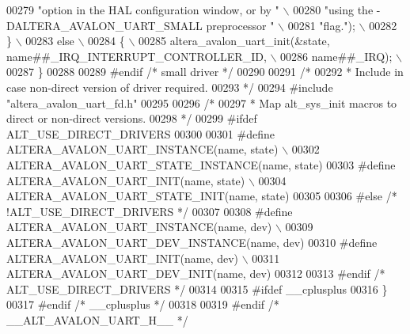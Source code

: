 \begin{DoxyCode}
00279 \textcolor{preprocessor}{                    "option in the HAL configuration window, or by "       \(\backslash\)}
00280 \textcolor{preprocessor}{                    "using the -DALTERA\_AVALON\_UART\_SMALL preprocessor "   \(\backslash\)}
00281 \textcolor{preprocessor}{                    "flag.");                                              \(\backslash\)}
00282 \textcolor{preprocessor}{  \}                                                                        \(\backslash\)}
00283 \textcolor{preprocessor}{  else                                                                     \(\backslash\)}
00284 \textcolor{preprocessor}{  \{                                                                        \(\backslash\)}
00285 \textcolor{preprocessor}{    altera\_avalon\_uart\_init(&state, name##\_IRQ\_INTERRUPT\_CONTROLLER\_ID,    \(\backslash\)}
00286 \textcolor{preprocessor}{      name##\_IRQ);                                                         \(\backslash\)}
00287 \textcolor{preprocessor}{  \}}
00288 
00289 \textcolor{preprocessor}{#endif }\textcolor{comment}{/* small driver */}\textcolor{preprocessor}{}
00290 
00291 \textcolor{comment}{/*}
00292 \textcolor{comment}{ * Include in case non-direct version of driver required.}
00293 \textcolor{comment}{ */}
00294 \textcolor{preprocessor}{#include "altera_avalon_uart_fd.h"}
00295 
00296 \textcolor{comment}{/*}
00297 \textcolor{comment}{ * Map alt\_sys\_init macros to direct or non-direct versions.}
00298 \textcolor{comment}{ */}
00299 \textcolor{preprocessor}{#ifdef ALT\_USE\_DIRECT\_DRIVERS}
00300 
00301 \textcolor{preprocessor}{#define ALTERA\_AVALON\_UART\_INSTANCE(name, state) \(\backslash\)}
00302 \textcolor{preprocessor}{   ALTERA\_AVALON\_UART\_STATE\_INSTANCE(name, state)}
00303 \textcolor{preprocessor}{#define ALTERA\_AVALON\_UART\_INIT(name, state) \(\backslash\)}
00304 \textcolor{preprocessor}{   ALTERA\_AVALON\_UART\_STATE\_INIT(name, state)}
00305 
00306 \textcolor{preprocessor}{#else }\textcolor{comment}{/* !ALT\_USE\_DIRECT\_DRIVERS */}\textcolor{preprocessor}{}
00307 
00308 \textcolor{preprocessor}{#define ALTERA\_AVALON\_UART\_INSTANCE(name, dev) \(\backslash\)}
00309 \textcolor{preprocessor}{   ALTERA\_AVALON\_UART\_DEV\_INSTANCE(name, dev)}
00310 \textcolor{preprocessor}{#define ALTERA\_AVALON\_UART\_INIT(name, dev) \(\backslash\)}
00311 \textcolor{preprocessor}{   ALTERA\_AVALON\_UART\_DEV\_INIT(name, dev)}
00312 
00313 \textcolor{preprocessor}{#endif }\textcolor{comment}{/* ALT\_USE\_DIRECT\_DRIVERS */}\textcolor{preprocessor}{}
00314 
00315 \textcolor{preprocessor}{#ifdef \_\_cplusplus}
00316 \}
00317 \textcolor{preprocessor}{#endif }\textcolor{comment}{/* \_\_cplusplus */}\textcolor{preprocessor}{}
00318 
00319 \textcolor{preprocessor}{#endif }\textcolor{comment}{/* \_\_ALT\_AVALON\_UART\_H\_\_ */}\textcolor{preprocessor}{}
\end{DoxyCode}
